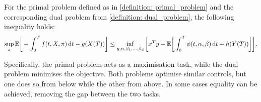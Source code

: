 \begin{theorem}
    \label{theorem: primal_dual_relationship}
    For the primal problem defined as in \cref{definition: primal_problem} and the corresponding dual problem from \cref{definition: dual_problem}, the following inequality holds:
    \begin{equation*}
    \sup_\pi \mathbb{E} \bigg[ -\int_{0}^T f(t, X,\pi) \mathop{}\!\mathrm{d} t - g(X(T)) \bigg] \le \inf_{y, \alpha, \beta_1, \dots, \beta_d} \bigg[ x^T y + \mathbb{E}\bigg[\int_{0}^T \phi(t,\alpha, \beta ) \mathop{}\!\mathrm{d} t + h(Y(T)) \bigg] \bigg].
    \end{equation*}
\end{theorem}

\begin{remark}
    Specifically, the primal problem acts as a maximisation task, while the dual problem minimises the objective. Both problems optimise similar controls, but one does so from below while the other from above. In some cases equality can be achieved, removing the gap between the two tasks.
\end{remark}

